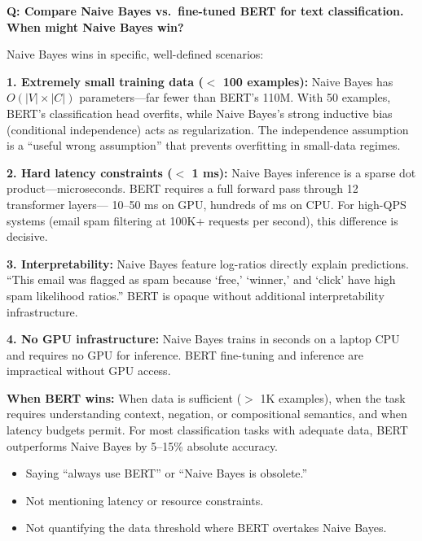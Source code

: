 \begin{interviewq}
\textbf{Q: Compare Naive Bayes vs.\ fine-tuned BERT for text classification. When might Naive
Bayes win?}

 \quad {} \quad \badgefreq{\freqmed}

\stronganswer
Naive Bayes wins in specific, well-defined scenarios:

\textbf{1. Extremely small training data ($<$ 100 examples):}  Naive Bayes has
$O(|V| \times |C|)$ parameters---far fewer than BERT's 110M.  With 50 examples, BERT's
classification head overfits, while Naive Bayes's strong inductive bias (conditional
independence) acts as regularization.  The independence assumption is a ``useful wrong
assumption'' that prevents overfitting in small-data regimes.

\textbf{2. Hard latency constraints ($<$ 1 ms):}  Naive Bayes inference is a sparse dot
product---microseconds.  BERT requires a full forward pass through 12 transformer layers---
10--50 ms on GPU, hundreds of ms on CPU.  For high-QPS systems (email spam filtering at
100K+ requests per second), this difference is decisive.

\textbf{3. Interpretability:}  Naive Bayes feature log-ratios directly explain predictions.
``This email was flagged as spam because `free,' `winner,' and `click' have high spam
likelihood ratios.''  BERT is opaque without additional interpretability infrastructure.

\textbf{4. No GPU infrastructure:}  Naive Bayes trains in seconds on a laptop CPU and
requires no GPU for inference.  BERT fine-tuning and inference are impractical without GPU
access.

\textbf{When BERT wins:}  When data is sufficient ($>$ 1K examples), when the task requires
understanding context, negation, or compositional semantics, and when latency budgets
permit.  For most classification tasks with adequate data, BERT outperforms Naive Bayes by
5--15\% absolute accuracy.

\redflags
\begin{itemize}
    \item Saying ``always use BERT'' or ``Naive Bayes is obsolete.''
    \item Not mentioning latency or resource constraints.
    \item Not quantifying the data threshold where BERT overtakes Naive Bayes.
\end{itemize}


\end{interviewq}
